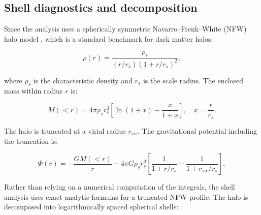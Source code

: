 \subsection{Shell diagnostics and decomposition}


Since the analysis uses a spherically symmetric Navarro--Frenk--White (NFW) halo model \citep{navarro1996structure}, which is a standard benchmark for dark matter halos:

\begin{equation}
\rho(r) = \frac{\rho_s}{(r/r_s)(1 + r/r_s)^2},
\end{equation}

where $\rho_s$ is the characteristic density and $r_s$ is the scale radius. The enclosed mass within radius $r$ is:

\begin{equation}
M(<r) = 4\pi \rho_s r_s^3 \left[ \ln(1+x) - \frac{x}{1+x} \right], \quad x = \frac{r}{r_s}.
\end{equation}

The halo is truncated at a virial radius $r_{\mathrm{vir}}$. The gravitational potential including the truncation is:

\begin{equation}
\Phi(r) = -\frac{G M(<r)}{r} - 4\pi G \rho_s r_s^2 \left[ \frac{1}{1 + r/r_s} - \frac{1}{1 + r_{\mathrm{vir}}/r_s} \right],
\end{equation}

Rather than relying on a numerical computation of the integrals, the shell analysis uses exact analytic formulas for a truncated NFW profile. The halo is decomposed into logarithmically spaced spherical shells:

